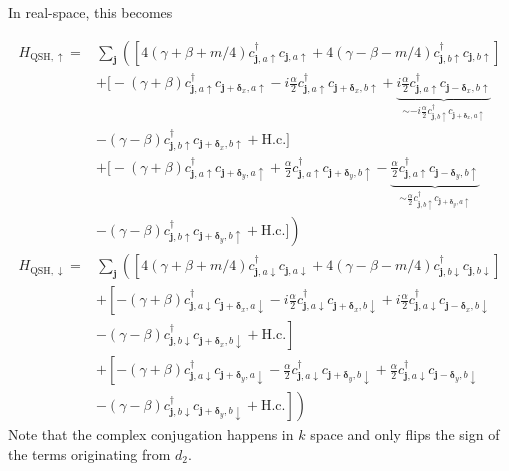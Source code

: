\documentclass[english]{scrartcl}
\begin{document}
In real-space, this becomes 

\begin{align*}
H_{\text{QSH}, \uparrow} = & \sum_{\bm j} \left ( \left [4(\gamma + \beta + m / 4) c^\dagger_{\bm{j},  a \uparrow} c_{\bm{j},  a \uparrow} + 4(\gamma - \beta - m / 4) c^\dagger_{\bm{j},  b \uparrow} c_{\bm{j}, b \uparrow} \right ] \right . \\
& + \bigg [-(\gamma + \beta) c^\dagger_{\bm{j},  a \uparrow} c_{\bm{j} + \bm \delta_x,  a \uparrow} - i \frac{\alpha}{2}  c^\dagger_{\bm{j},  a \uparrow} c_{\bm{j} + \bm \delta_x,  b \uparrow} + \underbrace{i \frac{\alpha}{2}  c^\dagger_{\bm{j},  a \uparrow} c_{\bm{j} - \bm \delta_x,  b \uparrow}}_{\sim -i \frac{\alpha}{2}  c^\dagger_{\bm{j},  b \uparrow} c_{\bm{j} + \bm \delta_x,  a \uparrow}}  \\
&  - (\gamma - \beta) c^\dagger_{\bm{j},  b \uparrow} c_{\bm{j} + \bm \delta_x,  b \uparrow} + \text{H.c.}\bigg]  \\
&  + \bigg [-(\gamma + \beta) c^\dagger_{\bm{j},  a \uparrow} c_{\bm{j} + \bm \delta_y,  a \uparrow} + \frac{\alpha}{2}  c^\dagger_{\bm{j},  a \uparrow} c_{\bm{j} + \bm \delta_y,  b \uparrow} - \underbrace{ \frac{\alpha}{2}  c^\dagger_{\bm{j},  a \uparrow} c_{\bm{j} - \bm \delta_y,  b \uparrow}}_{\sim \frac{\alpha}{2}  c^\dagger_{\bm{j},  b \uparrow} c_{\bm{j} + \bm \delta_y,  a \uparrow}}  \\
& \left .  -(\gamma - \beta) c^\dagger_{\bm{j},  b \uparrow} c_{\bm{j} + \bm \delta_y,  b \uparrow}  + \text{H.c.} \bigg ] \right ) \\
H_{\text{QSH}, \downarrow} = & \sum_{\bm j} \left ( \left [4(\gamma + \beta + m / 4) c^\dagger_{\bm{j},  a \downarrow} c_{\bm{j},  a \downarrow} + 4(\gamma - \beta - m / 4) c^\dagger_{\bm{j},  b \downarrow} c_{\bm{j}, b \downarrow} \right ] \right . \\
& + \left [-(\gamma + \beta) c^\dagger_{\bm{j},  a \downarrow} c_{\bm{j} + \bm \delta_x,  a \downarrow} - i \frac{\alpha}{2}  c^\dagger_{\bm{j},  a \downarrow} c_{\bm{j} + \bm \delta_x,  b \downarrow} + i \frac{\alpha}{2}  c^\dagger_{\bm{j},  a \downarrow} c_{\bm{j} - \bm \delta_x,  b \downarrow} \right .\\
& \left .  - (\gamma - \beta) c^\dagger_{\bm{j},  b \downarrow} c_{\bm{j} + \bm \delta_x,  b \downarrow} + \text{H.c.}\right ]  \\
&  + \left [-(\gamma + \beta) c^\dagger_{\bm{j},  a \downarrow} c_{\bm{j} + \bm \delta_y,  a \downarrow} - \frac{\alpha}{2}  c^\dagger_{\bm{j},  a \downarrow} c_{\bm{j} + \bm \delta_y,  b \downarrow} +  \frac{\alpha}{2}  c^\dagger_{\bm{j},  a \downarrow} c_{\bm{j} - \bm \delta_y,  b \downarrow} \right . \\
& \left . \left .  -(\gamma - \beta) c^\dagger_{\bm{j},  b \downarrow} c_{\bm{j} + \bm \delta_y,  b \downarrow}  + \text{H.c.} \right ] \right )
\end{align*}
Note that the complex conjugation happens in $k$ space and only flips the sign of the terms originating from $d_2$.
\end{document}

